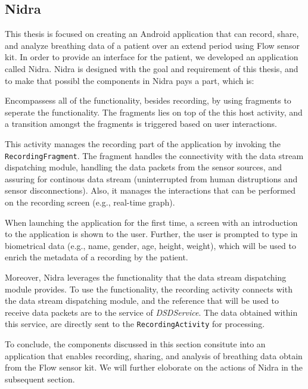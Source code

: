 \subsection{Nidra}
This thesis is focused on creating an Android application that can record, share, and analyze breathing data of a patient over an extend period using Flow sensor kit. In order to provide an interface for the patient, we developed an application called Nidra. Nidra is designed with the goal and requirement of this thesis, and to make that possibl the components in Nidra pays a part, which is: 

\begin{description}[font=\normalfont\itshape]
    \item[MainActivity] Encompassess all of the functionality, besides recording, by using fragments to seperate the functionality. The fragments lies on top of the this host activity, and a transition amongst the fragments is triggered based on user interactions. 
    \item[RecordingActivity] This activity manages the recording part of the application by invoking the \verb|RecordingFragment|. The fragment handles the connectivity with the data stream dispatching module, handling the data packets from the sensor sources, and assuring for continous data stream (uninterrupted from human distruptions and sensor disconnections). Also, it manages the interactions that can be performed on the recording screen (e.g., real-time graph).
    \item[LandingActivity] When launching the application for the first time, a screen with an introduction to the application is shown to the user. Further, the user is prompted to type in biometrical data (e.g., name, gender, age, height, weight), which will be used to enrich the metadata of a recording by the patient. 
\end{description}

Moreover, Nidra leverages the functionality that the data stream dispatching module provides. To use the functionality, the recording activity connects with the data stream dispatching module, and the reference that will be used to receive data packets are to the service of \textit{DSDService}. The data obtained within this service, are directly sent to the \verb|RecordingActivity| for processing.


To conclude, the components discussed in this section consitute into an application that enables recording, sharing, and analysis of breathing data obtain from the Flow sensor kit. We will further eloborate on the actions of Nidra in the subsequent section. 


